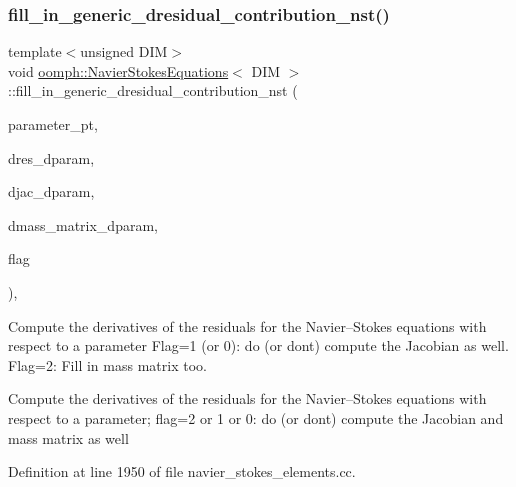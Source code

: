 \mbox{\label{classoomph_1_1NavierStokesEquations_aaf9e2397daf5996af01e9a80540979fa}} 
\subsubsection{\texorpdfstring{fill\+\_\+in\+\_\+generic\+\_\+dresidual\+\_\+contribution\+\_\+nst()}{fill\_in\_generic\_dresidual\_contribution\_nst()}}
{\footnotesize\ttfamily template$<$unsigned D\+IM$>$ \\
void \hyperlink{classoomph_1_1NavierStokesEquations}{oomph\+::\+Navier\+Stokes\+Equations}$<$ D\+IM $>$\+::fill\+\_\+in\+\_\+generic\+\_\+dresidual\+\_\+contribution\+\_\+nst (\begin{DoxyParamCaption}\item[{double $\ast$const \&}]{parameter\+\_\+pt,  }\item[{\hyperlink{classoomph_1_1Vector}{Vector}$<$ double $>$ \&}]{dres\+\_\+dparam,  }\item[{\hyperlink{classoomph_1_1DenseMatrix}{Dense\+Matrix}$<$ double $>$ \&}]{djac\+\_\+dparam,  }\item[{\hyperlink{classoomph_1_1DenseMatrix}{Dense\+Matrix}$<$ double $>$ \&}]{dmass\+\_\+matrix\+\_\+dparam,  }\item[{unsigned}]{flag }\end{DoxyParamCaption})\hspace{0.3cm}{\ttfamily [protected]}, {\ttfamily [virtual]}}



Compute the derivatives of the residuals for the Navier--Stokes equations with respect to a parameter Flag=1 (or 0)\+: do (or don\textquotesingle{}t) compute the Jacobian as well. Flag=2\+: Fill in mass matrix too. 

Compute the derivatives of the residuals for the Navier--Stokes equations with respect to a parameter; flag=2 or 1 or 0\+: do (or don\textquotesingle{}t) compute the Jacobian and mass matrix as well 

Definition at line 1950 of file navier\+\_\+stokes\+\_\+elements.\+cc.



